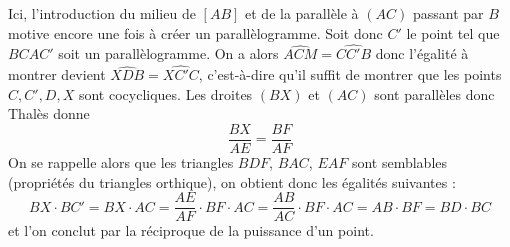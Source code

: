 \begin{sol}
\begin{center}
\end{center}

Ici, l'introduction du milieu de $[AB]$ et de la parallèle à $(AC)$ passant par $B$ motive encore une fois à créer un parallèlogramme. Soit donc $C'$ le point tel que $BCAC'$ soit un parallèlogramme. On a alors $\widehat{ACM}=\widehat{CC'B}$ donc l'égalité à montrer devient $\widehat{XDB}=\widehat{XC'C}$, c'est-à-dire qu'il suffit de montrer que les points $C,C',D,X$ sont cocycliques.
Les droites $(BX)$ et $(AC)$ sont parallèles donc Thalès donne
$$\frac{BX}{AE}=\frac{BF}{AF}$$
On se rappelle alors que les triangles $BDF$, $BAC$, $EAF$ sont semblables (propriétés du triangles orthique), on obtient donc les égalités suivantes :
$$BX\cdot BC'= BX\cdot AC=\frac{AE}{AF}\cdot BF\cdot AC=\frac{AB}{AC}\cdot BF\cdot AC=AB\cdot BF=BD\cdot BC$$ et l'on conclut par la réciproque de la puissance d'un point.
\end{sol}


